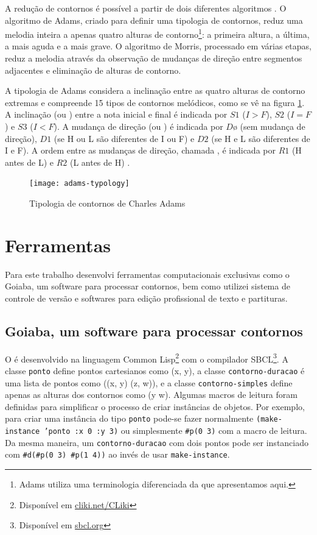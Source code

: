 A redução de contornos é possível a partir de dois diferentes
algoritmos \cite{adams76:melodic,morris93:directions}. O algoritmo de
Adams, criado para definir uma tipologia de contornos, reduz uma
melodia inteira a apenas quatro alturas de contorno\footnote{Adams
  utiliza uma terminologia diferenciada da que apresentamos aqui.}: a
primeira altura, a última, a mais aguda e a mais grave. O algoritmo de
Morris, processado em várias etapas, reduz a melodia através da
observação de mudanças de direção entre segmentos adjacentes e
eliminação de alturas de contorno.

A tipologia de Adams considera a inclinação entre as quatro alturas de
contorno extremas e compreende 15 tipos de contornos melódicos, como
se vê na figura \ref{fig:adams-typology}. A inclinação (ou
) entre a nota inicial e final é indicada por $S1$ ($I >
F$), $S2$ ($I = F$) e $S3$ ($I < F$). A mudança de direção (ou
) é indicada por $Dø$ (sem mudança de direção), $D1$
(se H ou L são diferentes de I ou F) e $D2$ (se H e L são diferentes
de I e F). A ordem entre as mudanças de direção, chamada
, é indicada por $R1$ (H antes de L) e $R2$ (L antes
de H) \cite{adams76:melodic}.

\begin{figure}
  \centering
  \texttt{[image: adams-typology]}
  \caption{Tipologia de contornos de Charles Adams}
  \label{fig:adams-typology}
\end{figure}

\chapter{Ferramentas}
\label{cha:ferramentas}

Para este trabalho desenvolvi ferramentas computacionais exclusivas
como o Goiaba, um software para processar contornos, bem como utilizei
sistema de controle de versão e softwares para edição profissional de
texto e partituras.

\section{Goiaba, um software para processar contornos}
\label{sec:goiaba-software-para}

O \goiaba{} é desenvolvido na linguagem Common
Lisp\footnote{Disponível em \url{cliki.net/CLiki}} com o compilador
SBCL\footnote{Disponível em \url{sbcl.org}}.
A classe \texttt{ponto} define pontos cartesianos como (x, y), a
classe \texttt{contorno-duracao} é uma lista de pontos como ((x, y)
(z, w)), e a classe \texttt{contorno-simples} define apenas as alturas
dos contornos como (y w). Algumas macros de leitura foram definidas
para simplificar o processo de criar instâncias de objetos. Por
exemplo, para criar uma instância do tipo \texttt{ponto} pode-se fazer
normalmente \texttt{(make-instance 'ponto :x 0 :y 3)} ou simplesmente
\verb!#p(0 3)! com a macro de leitura. Da mesma maneira, um
\texttt{contorno-duracao} com dois pontos pode ser instanciado com
\verb!#d(#p(0 3) #p(1 4))! ao invés de usar \texttt{make-instance}.

